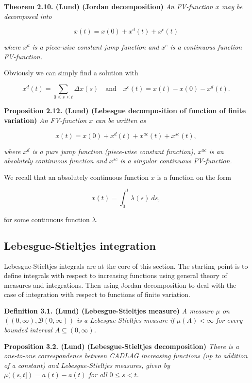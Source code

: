\documentclass[a4paper,12pt,openany]{book}
\begin{document}
\textbf{Theorem 2.10. (Lund) (Jordan decomposition)} \emph{An FV-function \(x\) may be decomposed into}

\[
x(t)=x(0)+x^d(t)+x^c(t)
\]

\emph{where \(x^d\) is a piece-wise constant jump function and \(x^c\) is a continuous function FV-function.}

Obviously we can simply find a solution with

\[
x^d(t)=\sum_{0\le s\le t}\Delta x(s)\quad \text{and}\quad x^c(t)=x(t)-x(0)-x^d(t).
\]

\textbf{Proposition 2.12. (Lund) (Lebesgue decomposition of function of finite variation)} \emph{An FV-function \(x\) can be written as}

\[
x(t)=x(0)+x^d(t)+x^{ac}(t)+x^{sc}(t),
\]

\emph{where \(x^d\) is a pure jump function (piece-wise constant function), \(x^{ac}\) is an absolutely continuous function and \(x^{sc}\) is a singular continuous FV-function.}

We recall that an absolutely continuous function \(x\) is a function on the form

\[
x(t)=\int_0^t\lambda(s)\ ds,
\]

for some continuous function \(\lambda\).

\hypertarget{lebesgue-stieltjes-integration}{%
\subsection{Lebesgue-Stieltjes integration}\label{lebesgue-stieltjes-integration}}

Lebesgue-Stieltjes integrals are at the core of this section. The starting point is to define integrals with respect to increasing functions using general theory of measures and integrations. Then using Jordan decomposition to deal with the case of integration with respect to functions of finite variation.

\textbf{Definition 3.1. (Lund) (Lebesgue-Stieltjes measure)} \emph{A measure \(\mu\) on \(((0,\infty),\mathcal B(0,\infty))\) is a Lebesgue-Stieltjes measure if \(\mu(A)<\infty\) for every bounded interval \(A\subseteq (0,\infty)\).}

\textbf{Proposition 3.2. (Lund) (Lebesgue-Stieltjes decomposition)} \emph{There is a one-to-one correspondence between CADLAG increasing functions (up to addition of a constant) and Lebesgue-Stieltjes measures, given by \(\mu((s,t])=a(t)-a(t)\) for all \(0\le s< t\).}
\end{document}

